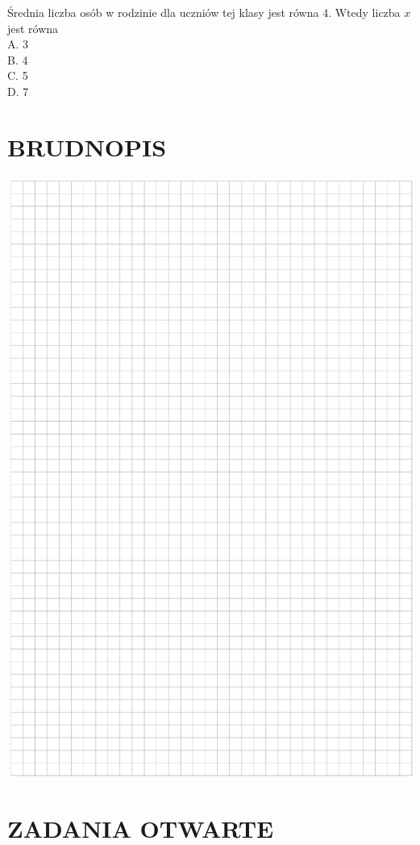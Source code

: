 \documentclass[10pt]{article}
\begin{document}
Średnia liczba osób w rodzinie dla uczniów tej klasy jest równa 4. Wtedy liczba \(x\) jest równa\\
A. 3\\
B. 4\\
C. 5\\
D. 7

\section*{BRUDNOPIS}
\begin{center}
\includegraphics[max width=\textwidth]{2024_11_21_5b6b7ffa9006e3f448adg-09}
\end{center}

\section*{ZADANIA OTWARTE}
\end{document}
